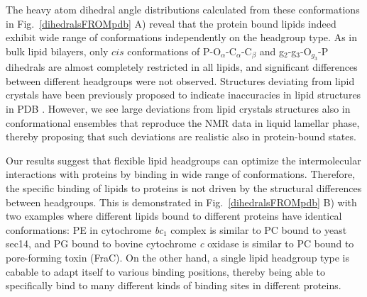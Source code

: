 \documentclass[aps,prl,superscriptaddress,twocolumn]{revtex4}
\begin{document}
The heavy atom dihedral angle distributions calculated from these conformations 
in Fig.~\ref{dihedralsFROMpdb} A) reveal that the protein bound lipids indeed exhibit wide
range of conformations independently on the headgroup type.
As in bulk lipid bilayers, only $cis$ conformations
of P-O$_\alpha$-C$_\alpha$-C$_\beta$ and g$_2$-g$_3$-O$_{g_3}$-P dihedrals are almost
completely restricted in all lipids, and significant differences between
different headgroups were not observed.
Structures deviating from lipid crystals 
have been previously proposed to indicate inaccuracies in lipid structures in PDB \cite{marsh13b,pezeshkian18}. 
However, we see large deviations from lipid crystals structures also in conformational ensembles
that reproduce the NMR data in liquid lamellar phase, thereby proposing that such deviations
are realistic also in protein-bound states.

Our results suggest that flexible lipid headgroups can optimize the intermolecular interactions with proteins by binding
in wide range of conformations.
Therefore, the specific binding of lipids to proteins is not driven by the structural differences between headgroups.
This is demonstrated in Fig.~\ref{dihedralsFROMpdb} B) with two examples where different lipids bound to
different proteins have identical conformations:
PE in cytochrome {\it bc}$_1$ complex is similar to PC bound to yeast sec14,
and PG bound to bovine cytochrome {\it c} oxidase is similar to PC bound to pore-forming toxin (FraC).
On the other hand, a single lipid headgroup type is cabable to adapt itself to various binding positions, 
thereby being able to specifically bind to many different kinds of binding sites in different proteins.
\end{document}
